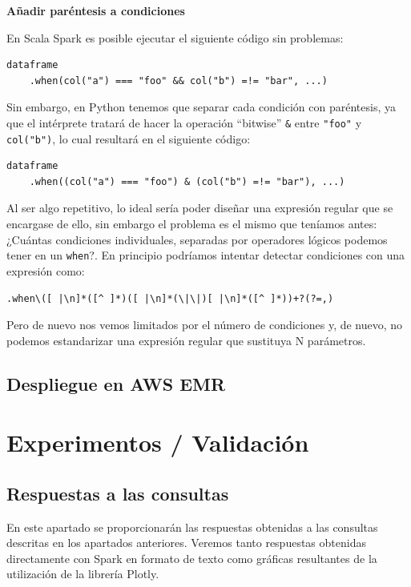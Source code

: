\documentclass[12pt,twoside,titlepage]{report}
\newcommand{\quotes}[1]{``#1''}
\begin{document}
\textbf{Añadir paréntesis a condiciones}

En Scala Spark es posible ejecutar el siguiente código sin problemas:

\begin{lstlisting}
dataframe
	.when(col("a") === "foo" && col("b") =!= "bar", ...)
\end{lstlisting}

Sin embargo, en Python tenemos que separar cada condición con paréntesis, ya que el intérprete tratará de hacer la operación \quotes{bitwise} \texttt{\&} entre \texttt{"foo"} y \texttt{col("b")}, lo cual resultará en el siguiente código:

\begin{lstlisting}
dataframe
	.when((col("a") === "foo") & (col("b") =!= "bar"), ...)
\end{lstlisting}

Al ser algo repetitivo, lo ideal sería poder diseñar una expresión regular que se encargase de ello, sin embargo el problema es el mismo que teníamos antes: ¿Cuántas condiciones individuales, separadas por operadores lógicos podemos tener en un \texttt{when}?. En principio podríamos intentar detectar condiciones con una expresión como:

\begin{lstlisting}
.when\([ |\n]*([^ ]*)([ |\n]*(\|\|)[ |\n]*([^ ]*))+?(?=,)
\end{lstlisting}

Pero de nuevo nos vemos limitados por el número de condiciones y, de nuevo, no podemos estandarizar una expresión regular que sustituya N parámetros.

\section{Despliegue en AWS EMR}



\chapter{Experimentos / Validación}
\label{sec:expVal}
\newpage





\section{Respuestas a las consultas}

En este apartado se proporcionarán las respuestas obtenidas a las consultas descritas en los apartados anteriores. Veremos tanto respuestas obtenidas directamente con Spark en formato de texto como gráficas resultantes de la utilización de la librería Plotly.
\end{document}
